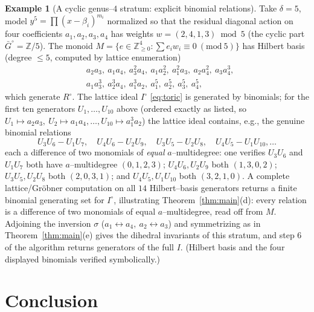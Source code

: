 \documentclass{amsart}
\theoremstyle{definition}
\newtheorem{example}[theorem]{Example}
\begin{document}
\begin{example}[A cyclic genus--$4$ stratum: explicit binomial relations]\label{ex:cyclic}
Take $\delta=5$, model $y^5=\prod(x-\beta_i)^{m_i}$ normalized so that the residual
diagonal action on four coefficients $a_1,a_2,a_3,a_4$ has weights
$w=(2,4,1,3)\bmod 5$ (the cyclic part $\bar G^{\circ}=\mathbb{Z}/5$). The monoid
$M=\{e\in\mathbb{Z}_{\ge0}^4:\sum e_iw_i\equiv0\ (\mathrm{mod}\ 5)\}$ has Hilbert
basis (degree $\le 5$, computed by lattice enumeration)
\[
\begin{aligned}
&a_2a_3,\ a_1a_4,\ a_3^2a_4,\ a_1a_2^2,\ a_1^2a_3,\ a_2a_4^2,\ a_3a_4^3,\\
&a_1a_3^3,\ a_2^3a_4,\ a_1^3a_2,\ a_1^5,\ a_2^5,\ a_3^5,\ a_4^5 ,
\end{aligned}
\]
which generate $R^{\circ}$. The lattice ideal $I^{\circ}$ \eqref{eq:toric} is
generated by binomials; for the first ten generators $U_1,\dots,U_{10}$ above
(ordered exactly as listed, so $U_1\mapsto a_2a_3,\ U_2\mapsto a_1a_4,\dots,
U_{10}\mapsto a_1^3a_2$) the lattice ideal contains, e.g., the genuine binomial
relations
\[
 U_3U_6-U_1U_7,\quad U_4U_6-U_2U_9,\quad U_3U_5-U_2U_8,\quad U_4U_5-U_1U_{10},\dots
\]
each a difference of two monomials of \emph{equal} $a$--multidegree: one verifies
$U_3U_6$ and $U_1U_7$ both have $a$--multidegree $(0,1,2,3)$;
$U_4U_6,U_2U_9$ both $(1,3,0,2)$; $U_3U_5,U_2U_8$ both $(2,0,3,1)$; and
$U_4U_5,U_1U_{10}$ both $(3,2,1,0)$. A complete lattice/Gr\"obner computation on
all $14$ Hilbert--basis generators returns a finite binomial generating set for
$I^{\circ}$, illustrating Theorem~\ref{thm:main}(d): every relation is a
difference of two monomials of equal $a$--multidegree, read off from $M$.
Adjoining the inversion $\sigma$
($a_1\!\leftrightarrow\!a_4,\ a_2\!\leftrightarrow\!a_3$) and symmetrizing as in
Theorem~\ref{thm:main}(e) gives the dihedral invariants of this stratum, and step
6 of the algorithm returns generators of the full $I$. (Hilbert basis and the
four displayed binomials verified symbolically.)
\end{example}

\section{Conclusion}
\end{document}
